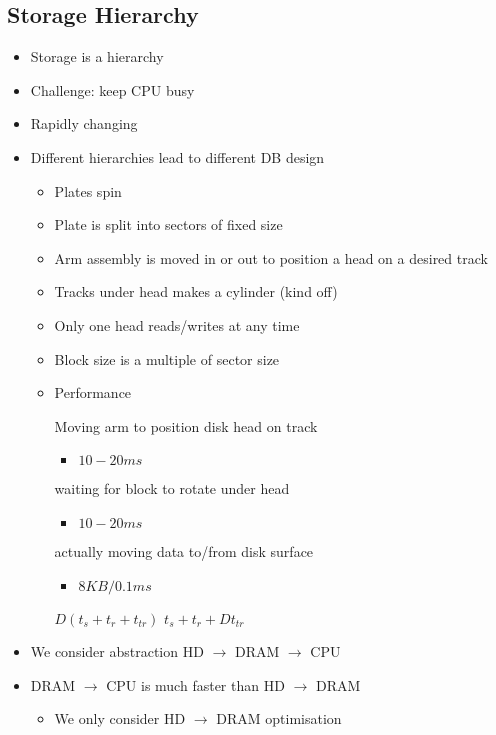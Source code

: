 \subsection{Storage Hierarchy}
\begin{itemize}
    \item Storage is a hierarchy
    \item Challenge: keep CPU busy
    \item Rapidly changing
    \item Different hierarchies lead to different DB design
        \begin{itemize}
            \item Plates spin
            \item Plate is split into sectors of fixed size
            \item Arm assembly is moved in or out to position a head on a desired track
            \item Tracks under head makes a cylinder (kind off)
            \item Only one head reads/writes at any time
            \item Block size is a multiple of sector size
            \item Performance
                \begin{itemize}
                     Moving arm to position disk head on track
                        \begin{itemize}
                            \item $10 - 20 ms$
                        \end{itemize}
                     waiting for block to rotate under head
                        \begin{itemize}
                            \item $10 - 20 ms$
                        \end{itemize}
                     actually moving data to/from disk surface
                        \begin{itemize}
                            \item $8KB / 0.1  ms$
                        \end{itemize}
                     $D(t_s + t_r + t_{tr})$
                     $t_s + t_r + Dt_{tr}$
                \end{itemize}
        \end{itemize}
    \item We consider abstraction HD $\to$ DRAM $\to$ CPU
    \item DRAM $\to$ CPU is much faster than HD $\to$ DRAM
        \begin{itemize}
            \item We only consider HD $\to$ DRAM optimisation
        \end{itemize}
\end{itemize}

